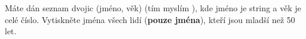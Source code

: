 \question[50]
Máte dán seznam dvojic (jméno, věk) (tím myslím ), kde jméno je string a věk je celé číslo. Vytiskněte jména
všech lidí (\textbf{pouze jména}), kteří jsou mladší než 50 let.